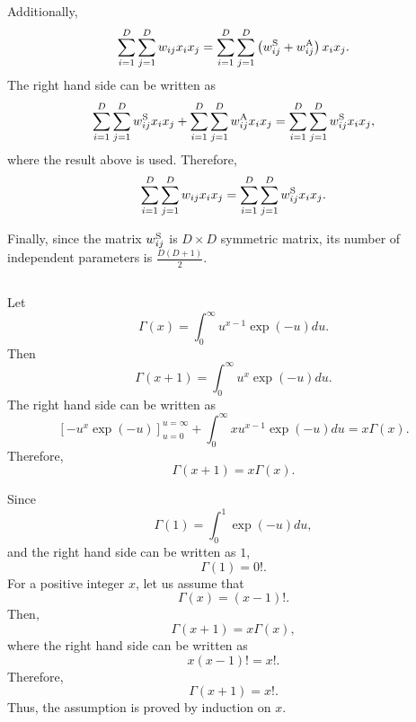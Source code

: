 Additionally,
%
\begin{equation}
\sum_{i = 1}^{D} \sum_{j = 1}^{D} w_{ij} x_i x_j = \sum_{i = 1}^{D} \sum_{j = 1}^{D} \left( w_{ij}^{\rm S} + w_{ij}^{\rm A} \right) x_i x_j.
\end{equation}
%
The right hand side can be written as
%
\begin{equation}
\sum_{i = 1}^{D} \sum_{j = 1}^{D} w_{ij}^{\rm S} x_i x_j + \sum_{i = 1}^{D} \sum_{j = 1}^{D} w_{ij}^{\rm A} x_i x_j = \sum_{i = 1}^{D} \sum_{j = 1}^{D} w_{ij}^{\rm S} x_i x_j,
\end{equation}
%
where the result above is used. 
Therefore,
%
\begin{equation}
\sum_{i = 1}^{D} \sum_{j = 1}^{D} w_{ij} x_i x_j = \sum_{i = 1}^{D} \sum_{j = 1}^{D} w_{ij}^{\rm S} x_i x_j.
\end{equation}
%

Finally, since the matrix $w_{ij}^{\rm S}$ is $D \times D$ symmetric matrix, its number of independent parameters is $\frac{D (D + 1)}{2}$.






\subsection{}
Let
%
\begin{equation}
\Gamma(x) = \int_{0}^{\infty} u ^ {x - 1} \exp(- u) du.
\end{equation}
%
Then
%
\begin{equation}
\Gamma(x + 1) = \int_{0}^{\infty} u ^ {x} \exp(- u) du.
\end{equation}
%
The right hand side can be written as 
%
\begin{equation}
\left[ - u ^ x \exp(- u) \right]_{u = 0}^{u = \infty} + \int_{0}^{\infty} x u ^ {x - 1} \exp(- u) du = x \Gamma(x).
\end{equation}
%
Therefore,
%
\begin{equation}
\Gamma( x + 1) = x \Gamma(x).
\end{equation}
%

Since
%
\begin{equation}
\Gamma(1) = \int_{0}^{1} \exp(- u) du,
\end{equation}
%
and the right hand side can be written as $1$,
%
\begin{equation}
\Gamma(1) = 0!.
\end{equation}
%
For a positive integer $x$, let us assume that
%
\begin{equation}
\Gamma(x) = (x - 1)!.
\end{equation}
%
Then,
%
\begin{equation}
\Gamma(x + 1) = x \Gamma(x),
\end{equation}
%
where the right hand side can be written as
%
\begin{equation}
x (x - 1)! = x!.
\end{equation}
%
Therefore,
%
\begin{equation}
\Gamma(x + 1) = x!.
\end{equation}
%
Thus, the assumption is proved by induction on $x$.


